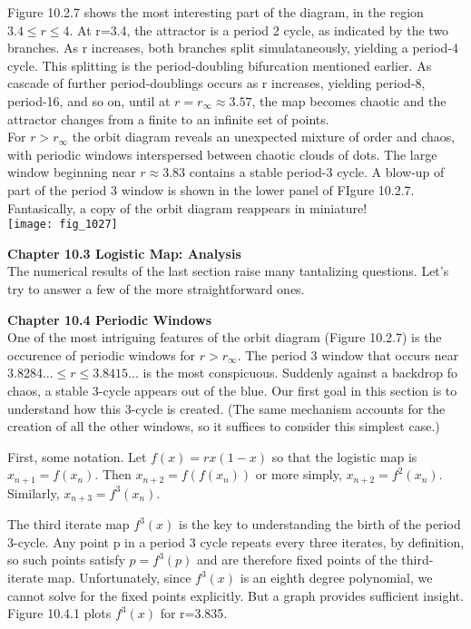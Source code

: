 \documentclass{article}
\newcommand\tab[1][1cm]{\hspace*{#1}}
\begin{document}
Figure 10.2.7 shows the most interesting part of the diagram, in the region $3.4 \leq r \leq 4$. At r=3.4, the attractor is a period 2 cycle, as indicated by the two branches. As r increases, both branches split simulataneously, yielding a period-4 cycle. This splitting is the period-doubling bifurcation mentioned earlier. As cascade of further period-doublings occurs as r increases, yielding period-8, period-16, and so on, until at $r=r_{\infty} \approx 3.57$, the map becomes chaotic and the attractor changes from a finite to an infinite set of points. \\ \tab
For $r> r_{\infty}$ the orbit diagram reveals an unexpected mixture of order and chaos, with periodic windows interspersed between chaotic clouds of dots. The large window beginning near $r \approx 3.83$ contains a stable period-3 cycle. A blow-up of part of the period 3 window is shown in the lower panel of FIgure 10.2.7. Fantasically, a copy of the orbit diagram reappears in miniature! \\

\texttt{[image: fig\_1027]}

\textbf {Chapter 10.3 Logistic Map: Analysis} \\
The numerical results of the last section raise many tantalizing questions. Let's try to answer a few of the more straightforward ones.

\textbf {Chapter 10.4 Periodic Windows} \\

One of the most intriguing features of the orbit diagram (Figure 10.2.7) is the occurence of periodic windows for $r>r_{\infty}$. The period 3 window that occurs near 3.8284...$\leq r \leq 3.8415...$ is the most conspicuous. Suddenly against a backdrop fo chaos, a stable 3-cycle appears out of the blue. Our first goal in this section is to understand how this 3-cycle is created. (The same mechanism accounts for the creation of all the other windows, so it suffices to consider this simplest case.) \\ \tab

First, some notation. Let $f(x)=rx(1-x)$ so that the logistic map is $x_{n+1}=f(x_{n})$. Then $x_{n+2}=f(f(x_{n}))$ or more simply, $x_{n+2}=f^{2}(x_{n})$. Similarly, $x_{n+3}=f^{3}(x_{n})$. \\ \tab

The third iterate map $f^{3}(x)$ is the key to understanding the birth of the period 3-cycle. Any point p in a period 3 cycle repeats every three iterates, by definition, so such points satisfy $p=f^{3}(p)$ and are therefore fixed points of the third-iterate map. Unfortunately, since $f^{3}(x)$ is an eighth degree polynomial, we cannot solve for the fixed points explicitly. But a graph provides sufficient insight. Figure 10.4.1 plots $f^{3}(x)$ for r=3.835. \\
\end{document}
